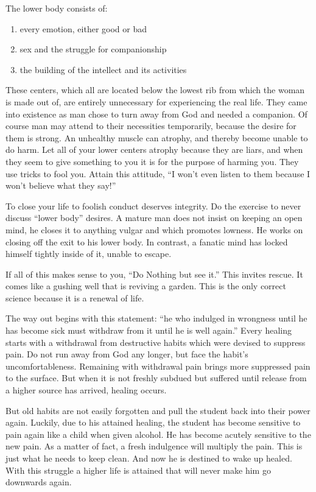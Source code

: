 \documentclass[12pt,letterpaper]{article}
\begin{document}
The lower body consists of:
\begin{enumerate}
\item every emotion, either good or bad
\item sex and the struggle for companionship
\item the building of the intellect and its activities
\end{enumerate} These centers, which all are located below the lowest
rib from which the woman is made out of, are entirely unnecessary for
experiencing the real life. They came into existence as man chose to
turn away from God and needed a companion. Of course man may attend to
their necessities temporarily, because the desire for them is
strong. An unhealthy muscle can atrophy, and thereby become unable to
do harm. Let all of your lower centers atrophy because they are liars,
and when they seem to give something to you it is for the purpose of
harming you. They use tricks to fool you. Attain this attitude, ``I
won't even listen to them because I won't believe what they say!''

To close your life to foolish conduct deserves integrity. Do the
exercise to never discuss ``lower body'' desires. A mature man does
not insist on keeping an open mind, he closes it to anything vulgar
and which promotes lowness. He works on closing off the exit to his
lower body. In contrast, a fanatic mind has locked himself tightly
inside of it, unable to escape.

If all of this makes sense to you, ``Do Nothing but see it.'' This
invites rescue. It comes like a gushing well that is reviving a
garden. This is the only correct science because it is a renewal of
life.

The way out begins with this statement: ``he who indulged in wrongness
until he has become sick must withdraw from it until he is well
again.'' Every healing starts with a withdrawal from destructive
habits which were devised to suppress pain. Do not run away from God
any longer, but face the habit's uncomfortableness. Remaining with
withdrawal pain brings more suppressed pain to the surface. But when
it is not freshly subdued but suffered until release from a higher
source has arrived, healing occurs.

But old habits are not easily forgotten and pull the student back into
their power again. Luckily, due to his attained healing, the student
has become sensitive to pain again like a child when given alcohol. He
has become acutely sensitive to the new pain. As a matter of fact, a
fresh indulgence will multiply the pain. This is just what he needs to
keep clean. And now he is destined to wake up healed. With this
struggle a higher life is attained that will never make him go
downwards again.
\end{document}
